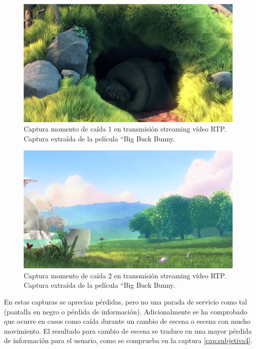 \documentclass[a4paper,11pt]{book}
\begin{document}
\begin{figure}[h]
\centering
\includegraphics[scale=0.40]{./figuras/subjetiva1}
\caption[Captura momento de caída 1 en transmisión streaming vídeo \ac{RTP}.]{Captura momento de caída 1 en transmisión streaming vídeo \ac{RTP}. Captura extraída de la película ``Big Buck Bunny.}
\label{cap:subjetiva1}
\end{figure}

\begin{figure}[h]
\centering
\includegraphics[scale=0.40]{./figuras/subjetiva2}
\caption[Captura momento de caída 2 en transmisión streaming vídeo \ac{RTP}.]{Captura momento de caída 2 en transmisión streaming vídeo \ac{RTP}. Captura extraída de la película ``Big Buck Bunny.}
\label{cap:subjetiva2}
\end{figure}

En estas capturas se aprecian pérdidas, pero no una parada de servicio como tal (pantalla en negro o pérdida de información). Adicionalmente se ha comprobado que ocurre en casos como caída durante un cambio de escena o escena con mucho movimiento. El resultado para cambio de escena se traduce en una mayor pérdida de información para el usuario, como se comprueba en la captura \ref{cap:subjetiva4}. 
\end{document}
